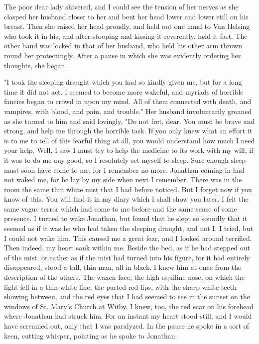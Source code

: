 The poor dear lady shivered, and I could see the tension of her nerves as she clasped her husband closer to her and bent her head lower and lower still on his breast. Then she raised her head proudly, and held out one hand to Van Helsing who took it in his, and after stooping and kissing it reverently, held it fast. The other hand was locked in that of her husband, who held his other arm thrown round her protectingly. After a pause in which she was evidently ordering her thoughts, she began. 

"I took the sleeping draught which you had so kindly given me, but for a long time it did not act. I seemed to become more wakeful, and myriads of horrible fancies began to crowd in upon my mind. All of them connected with death, and vampires, with blood, and pain, and trouble." Her husband involuntarily groaned as she turned to him and said lovingly, "Do not fret, dear. You must be brave and strong, and help me through the horrible task. If you only knew what an effort it is to me to tell of this fearful thing at all, you would understand how much I need your help. Well, I saw I must try to help the medicine to its work with my will, if it was to do me any good, so I resolutely set myself to sleep. Sure enough sleep must soon have come to me, for I remember no more. Jonathan coming in had not waked me, for he lay by my side when next I remember. There was in the room the same thin white mist that I had before noticed. But I forget now if you know of this. You will find it in my diary which I shall show you later. I felt the same vague terror which had come to me before and the same sense of some presence. I turned to wake Jonathan, but found that he slept so soundly that it seemed as if it was he who had taken the sleeping draught, and not I. I tried, but I could not wake him. This caused me a great fear, and I looked around terrified. Then indeed, my heart sank within me. Beside the bed, as if he had stepped out of the mist, or rather as if the mist had turned into his figure, for it had entirely disappeared, stood a tall, thin man, all in black. I knew him at once from the description of the others. The waxen face, the high aquiline nose, on which the light fell in a thin white line, the parted red lips, with the sharp white teeth showing between, and the red eyes that I had seemed to see in the sunset on the windows of St. Mary's Church at Witby. I knew, too, the red scar on his forehead where Jonathan had struck him. For an instant my heart stood still, and I would have screamed out, only that I was paralyzed. In the pause he spoke in a sort of keen, cutting whisper, pointing as he spoke to Jonathan. 

